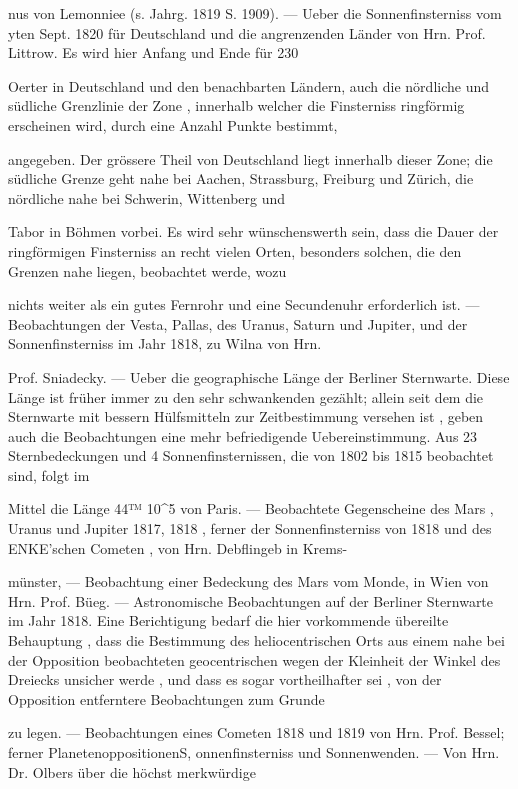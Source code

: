 \documentclass[10pt,a4paper]{article}
\begin{document}
nus von Lemonniee (s. Jahrg. 1819 S. 1909). — Ueber die Sonnenfinsterniss vom yten Sept. 1820 für Deutschland und die angrenzenden Länder von Hrn. Prof. Littrow. Es wird hier Anfang und Ende für 230

Oerter in Deutschland und den benachbarten Ländern, auch die nördliche und südliche Grenzlinie der Zone , innerhalb welcher die Finsterniss ringförmig erscheinen wird, durch eine Anzahl Punkte bestimmt,

angegeben. Der grössere Theil von Deutschland liegt innerhalb dieser Zone; die südliche Grenze geht nahe bei Aachen, Strassburg, Freiburg und Zürich, die nördliche nahe bei Schwerin, Wittenberg und

Tabor in Böhmen vorbei. Es wird sehr wünschenswerth sein, dass die Dauer der ringförmigen Finsterniss an recht vielen Orten, besonders solchen, die den Grenzen nahe liegen, beobachtet werde, wozu

nichts weiter als ein gutes Fernrohr und eine Secundenuhr erforderlich ist. — Beobachtungen der Vesta, Pallas, des Uranus, Saturn und Jupiter, und der Sonnenfinsterniss im Jahr 1818, zu Wilna von Hrn.

Prof. Sniadecky. — Ueber die geographische Länge der Berliner Sternwarte. Diese Länge ist früher immer zu den sehr schwankenden gezählt; allein seit dem die Sternwarte mit bessern Hülfsmitteln zur Zeitbestimmung versehen ist , geben auch die Beobachtungen eine mehr befriedigende Uebereinstimmung. Aus 23 Sternbedeckungen und 4 Sonnenfinsternissen, die von 1802 bis 1815 beobachtet sind, folgt im

Mittel die Länge 44™ 10\textasciicircum{}5 von Paris. — Beobachtete Gegenscheine des Mars , Uranus und Jupiter 1817, 1818 , ferner der Sonnenfinsterniss von 1818 und des ENKE'schen Cometen , von Hrn. Debflingeb in Krems-

münster, — Beobachtung einer Bedeckung des Mars vom Monde, in Wien von Hrn. Prof. Büeg. — Astronomische Beobachtungen auf der Berliner Sternwarte im Jahr 1818. Eine Berichtigung bedarf die hier vorkommende übereilte Behauptung , dass die Bestimmung des heliocentrischen Orts aus einem nahe bei der Opposition beobachteten geocentrischen wegen der Kleinheit der Winkel des Dreiecks unsicher werde , und dass es sogar vortheilhafter sei , von der Opposition entferntere Beobachtungen zum Grunde

zu legen. — Beobachtungen eines Cometen 1818 und 1819 von Hrn. Prof. Bessel; ferner PlanetenoppositionenS, onnenfinsterniss und Sonnenwenden. — Von Hrn. Dr. Olbers über die höchst merkwürdige
\end{document}
